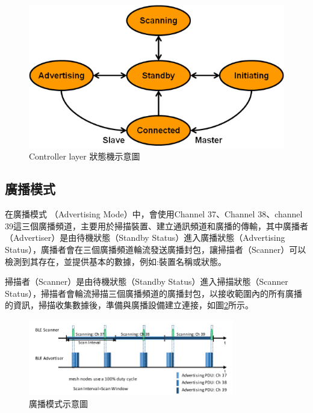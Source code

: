 \begin{ZhChapter}
\begin{figure}[H]
    \centering
    \includegraphics[width = 1\textwidth]{image/ble-link-layer-sm.png}
    \caption{Controller layer 狀態機示意圖\cite{microchip2023}}
    \label{fig: Controller layer 狀態機示意圖}
\end{figure}

\subsection{廣播模式}

在廣播模式 （Advertising Mode）中，會使用Channel 37、Channel 38、channel 39這三個廣播頻道，主要用於掃描裝置、建立通訊頻道和廣播的傳輸，其中廣播者（Advertiser）是由待機狀態（Standby Status）進入廣播狀態（Advertising Status），廣播者會在三個廣播頻道輪流發送廣播封包，讓掃描者（Scanner）可以檢測到其存在，並提供基本的數據，例如:裝置名稱或狀態。

掃描者（Scanner）是由待機狀態（Standby Status）進入掃描狀態（Scanner Status），掃描者會輪流掃描三個廣播頻道的廣播封包，以接收範圍內的所有廣播的資訊，掃描收集數據後，準備與廣播設備建立連接，如圖\ref{fig: 廣播模式示意圖}所示。
\begin{figure}[H]
    \centering
    \includegraphics[width = 0.8\textwidth]{image/廣播模式示意圖.png}
    \caption{廣播模式示意圖\cite{9035389}}
    \label{fig: 廣播模式示意圖}
\end{figure}


\end{ZhChapter}
